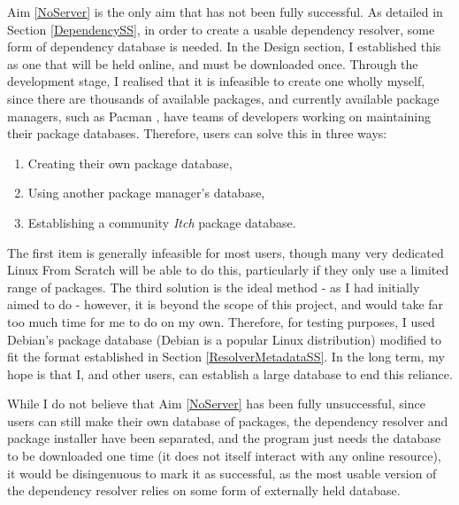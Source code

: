 \documentclass[10pt]{article}
\begin{document}
Aim \ref{NoServer} is the only aim that has not been fully successful. As detailed in Section \ref{DependencySS}, in order to create a usable dependency resolver, some form of dependency database is needed. In the Design section, I established this as one that will be held online, and must be downloaded once. Through the development stage, I realised that it is infeasible to create one wholly myself, since there are thousands of available packages, and currently available package managers, such as Pacman \cite{ArchWikiPacman}, have teams of developers working on maintaining their package databases. Therefore, users can solve this in three ways:
\begin{enumerate}
    \item Creating their own package database,
    \item Using another package manager's database,
    \item Establishing a community \textit{Itch} package database.
\end{enumerate}
The first item is generally infeasible for most users, though many very dedicated Linux From Scratch will be able to do this, particularly if they only use a limited range of packages. The third solution is the ideal method - as I had initially aimed to do - however, it is beyond the scope of this project, and would take far too much time for me to do on my own. Therefore, for testing purposes, I used Debian's package database (Debian is a popular Linux distribution) modified to fit the format established in Section \ref{ResolverMetadataSS}. In the long term, my hope is that I, and other users, can establish a large database to end this reliance.

While I do not believe that Aim \ref{NoServer} has been fully unsuccessful, since users can still make their own database of packages, the dependency resolver and package installer have been separated, and the program just needs the database to be downloaded one time (it does not itself interact with any online resource), it would be disingenuous to mark it as successful, as the most usable version of the dependency resolver relies on some form of externally held database.
\end{document}
